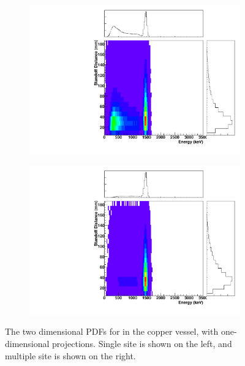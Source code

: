 \documentclass[herrin-thesis.tex]{subfiles}
\begin{document}
\begin{figure}[hp]
\centering
	\begin{subfigure}[b]{0.35\textwidth}
	\centering
	\includegraphics[width=\textwidth]{./plots/PDFs/analysis_pdf_AllVessel_K40_ss.pdf}
\end{subfigure}\hspace{0.1\textwidth}%
\begin{subfigure}[b]{0.35\textwidth}
	\centering
	\includegraphics[width=1\textwidth]{./plots/PDFs/analysis_pdf_AllVessel_K40_ms.pdf}
	\end{subfigure}
\caption[PDF for  in the TPC vessel]{The two dimensional PDFs for  in the copper vessel, with one-dimensional projections. Single site is shown on the left, and multiple site is shown on the right.}
\label{fig:analysis_pdf_AllVessel_K40}
\end{figure}
\end{document}
